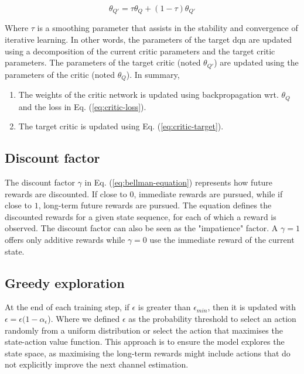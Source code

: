 \begin{equation}\label{eq:critic-target}
    \theta_{Q'} = \tau \theta_Q + (1-\tau ) \theta_{Q'}
\end{equation}

\noindent Where $\tau$ is a smoothing parameter that assists in the stability and convergence of iterative learning. In other words, the parameters of the target \gls{dqn} are updated using a decomposition of the current critic parameters and the target critic parameters. The parameters of the target critic (noted $\theta_{Q'}$) are updated using the parameters of the critic (noted $\theta_Q$). In summary, 

\begin{enumerate}
    \item The weights of the critic network is updated using backpropagation wrt. $\theta_Q$ and the loss in Eq. (\ref{eq:critic-loss}).
    \item The target critic is updated using Eq. (\ref{eq:critic-target}).
\end{enumerate}

\subsection{Discount factor}
The discount factor $\gamma$ in Eq. (\ref{eq:bellman-equation}) represents how future rewards are discounted. If close to $0$, immediate rewards are pursued, while if close to $1$, long-term future rewards are pursued. The equation defines the discounted rewards for a given state sequence, for each of which a reward is observed. The discount factor can also be seen as the "impatience" factor. A $\gamma = 1$ offers only additive rewards while $\gamma = 0$ use the immediate reward of the current state. 

\subsection{Greedy exploration}
At the end of each training step, if $\epsilon$ is greater than $\epsilon_{min}$, then it is updated with $\epsilon = \epsilon (1-\alpha_{\epsilon}$). Where we defined $\epsilon$ as the probability threshold to select an action randomly from a uniform distribution or select the action that maximises the state-action value function. This approach is to ensure the model explores the state space, as maximising the long-term rewards might include actions that do not explicitly improve the next channel estimation.




